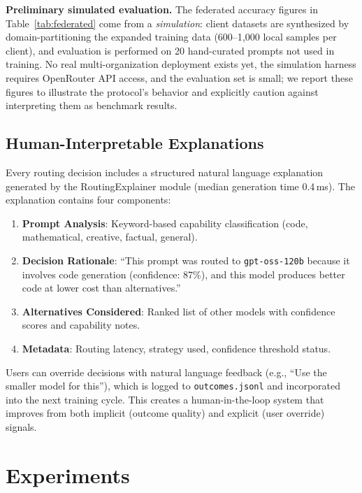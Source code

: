 \documentclass[11pt,a4paper]{article}
\begin{document}
\textbf{Preliminary simulated evaluation.}
The federated accuracy figures in Table~\ref{tab:federated} come from a \textit{simulation}: client datasets are synthesized by domain-partitioning the expanded training data (600--1{,}000 local samples per client), and evaluation is performed on 20 hand-curated prompts not used in training.
No real multi-organization deployment exists yet, the simulation harness requires OpenRouter API access, and the evaluation set is small; we report these figures to illustrate the protocol's behavior and explicitly caution against interpreting them as benchmark results.

\subsection{Human-Interpretable Explanations}
\label{sec:explainer}

Every routing decision includes a structured natural language explanation generated by the RoutingExplainer module (median generation time 0.4\,ms).
The explanation contains four components:

\begin{enumerate}[leftmargin=*]
    \item \textbf{Prompt Analysis}: Keyword-based capability classification (code, mathematical, creative, factual, general).
    \item \textbf{Decision Rationale}: ``This prompt was routed to \texttt{gpt-oss-120b} because it involves code generation (confidence: 87\%), and this model produces better code at lower cost than alternatives.''
    \item \textbf{Alternatives Considered}: Ranked list of other models with confidence scores and capability notes.
    \item \textbf{Metadata}: Routing latency, strategy used, confidence threshold status.
\end{enumerate}

Users can override decisions with natural language feedback (e.g., ``Use the smaller model for this''), which is logged to \texttt{outcomes.jsonl} and incorporated into the next training cycle.
This creates a human-in-the-loop system that improves from both implicit (outcome quality) and explicit (user override) signals.

\section{Experiments}
\end{document}
